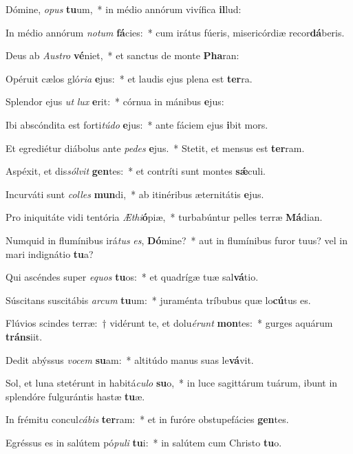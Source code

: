 \item Dómine, \textit{o}\textit{pus} \textbf{tu}um,~* in médio annórum vivífica \textbf{il}lud:
\item In médio annórum \textit{no}\textit{tum} \textbf{fá}cies:~* cum irátus fúeris, misericórdiæ recor\textbf{dá}beris.
\item Deus ab \textit{Aus}\textit{tro} \textbf{vé}niet,~* et sanctus de monte \textbf{Pha}ran:
\item Opéruit cælos gló\textit{ri}\textit{a} \textbf{e}jus:~* et laudis ejus plena est \textbf{ter}ra.
\item Splendor ejus \textit{ut} \textit{lux} \textbf{e}rit:~* córnua in mánibus \textbf{e}jus:
\item Ibi abscóndita est forti\textit{tú}\textit{do} \textbf{e}jus:~* ante fáciem ejus \textbf{i}bit mors.
\item Et egrediétur diábolus ante \textit{pe}\textit{des} \textbf{e}jus.~* Stetit, et mensus est \textbf{ter}ram.
\item Aspéxit, et dis\textit{sól}\textit{vit} \textbf{gen}tes:~* et contríti sunt montes \textbf{sǽ}culi.
\item Incurváti sunt \textit{col}\textit{les} \textbf{mun}di,~* ab itinéribus æternitátis \textbf{e}jus.
\item Pro iniquitáte vidi tentória \textit{Æ}\textit{thi}\textbf{ó}piæ,~* turbabúntur pelles terræ \textbf{Má}dian.
\item Numquid in flumínibus irá\textit{tus} \textit{es}, \textbf{Dó}mine?~* aut in flumínibus furor tuus? vel in mari indignátio \textbf{tu}a?
\item Qui ascéndes super \textit{e}\textit{quos} \textbf{tu}os:~* et quadrígæ tuæ sal\textbf{vá}tio.
\item Súscitans suscitábis \textit{ar}\textit{cum} \textbf{tu}um:~* juraménta tríbubus quæ lo\textbf{cú}tus es.
\item Flúvios scindes terræ:~† vidérunt te, et dolu\textit{é}\textit{runt} \textbf{mon}tes:~* gurges aquárum \textbf{tráns}iit.
\item Dedit abýssus \textit{vo}\textit{cem} \textbf{su}am:~* altitúdo manus suas le\textbf{vá}vit.
\item Sol, et luna stetérunt in habitá\textit{cu}\textit{lo} \textbf{su}o,~* in luce sagittárum tuárum, ibunt in splendóre fulgurántis hastæ \textbf{tu}æ.
\item In frémitu concul\textit{cá}\textit{bis} \textbf{ter}ram:~* et in furóre obstupefácies \textbf{gen}tes.
\item Egréssus es in salútem pó\textit{pu}\textit{li} \textbf{tu}i:~* in salútem cum Christo \textbf{tu}o.
